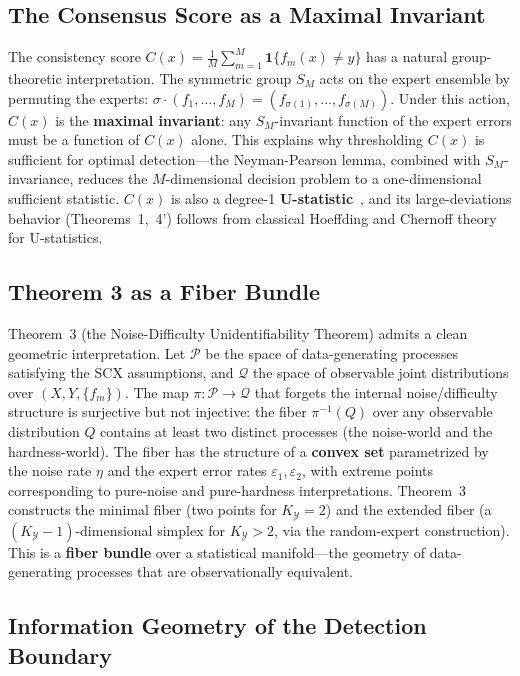 \documentclass[twocolumn]{article}
\theoremstyle{definition}
\begin{document}
\subsection{The Consensus Score as a Maximal Invariant}

The consistency score $C(x) = \frac{1}{M}\sum_{m=1}^M \mathbf{1}\{f_m(x) \neq y\}$ has a natural group-theoretic interpretation. The symmetric group $S_M$ acts on the expert ensemble by permuting the experts: $\sigma \cdot (f_1, \dots, f_M) = (f_{\sigma(1)}, \dots, f_{\sigma(M)})$. Under this action, $C(x)$ is the \textbf{maximal invariant}: any $S_M$-invariant function of the expert errors must be a function of $C(x)$ alone. This explains why thresholding $C(x)$ is sufficient for optimal detection---the Neyman-Pearson lemma, combined with $S_M$-invariance, reduces the $M$-dimensional decision problem to a one-dimensional sufficient statistic. $C(x)$ is also a degree-1 \textbf{U-statistic}~\cite{hoe73}, and its large-deviations behavior (Theorems~1,~4') follows from classical Hoeffding and Chernoff theory for U-statistics.

\subsection{Theorem 3 as a Fiber Bundle}

Theorem~3 (the Noise-Difficulty Unidentifiability Theorem) admits a clean geometric interpretation. Let $\mathcal{P}$ be the space of data-generating processes satisfying the SCX assumptions, and $\mathcal{Q}$ the space of observable joint distributions over $(X, Y, \{f_m\})$. The map $\pi: \mathcal{P} \to \mathcal{Q}$ that forgets the internal noise/difficulty structure is surjective but not injective: the fiber $\pi^{-1}(Q)$ over any observable distribution $Q$ contains at least two distinct processes (the noise-world and the hardness-world). The fiber has the structure of a \textbf{convex set} parametrized by the noise rate $\eta$ and the expert error rates $\varepsilon_1, \varepsilon_2$, with extreme points corresponding to pure-noise and pure-hardness interpretations. Theorem~3 constructs the minimal fiber (two points for $K_{\mathcal{Y}}=2$) and the extended fiber (a $(K_{\mathcal{Y}}-1)$-dimensional simplex for $K_{\mathcal{Y}}>2$, via the random-expert construction). This is a \textbf{fiber bundle} over a statistical manifold---the geometry of data-generating processes that are observationally equivalent.

\subsection{Information Geometry of the Detection Boundary}
\end{document}
